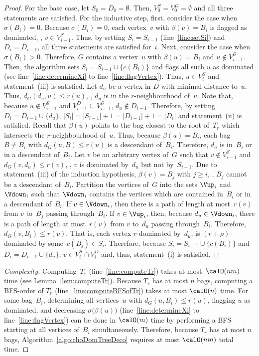 \begin{proof}
For the base case, let $S_0 = D_0 = \emptyset$.
Then, $V^S_0 = V^D_0 = \emptyset$ and all three statements are satisfied.
For the inductive step, first, consider the case when $\sigma(B_i) = 0$.
Because $\sigma(B_i) = 0$, each vertex~$v$ with $\beta(v) = B_i$ is flagged as dominated, \ie, $v \in V^S_{i-1}$.
Thus, by setting $S_i = S_{i - 1}$ (line~\ref{line:setSi}) and $D_i = D_{i - 1}$, all three statements are satisfied for~$i$.
Next, consider the case when $\sigma(B_i) > 0$.
Therefore, $G$ contains a vertex~$u$ with $\beta(u) = B_i$ and $u \notin V^S_{i-1}$.
Then, the algorithm sets $S_i = S_{i-1} \cup \big \{ c(B_i) \big \}$ and flags all such $u$ as dominated (see line~\ref{line:determineXi} to line~\ref{line:flagVertex}).
Thus, $u \in V^S_i$ and statement~(iii) is satisfied.
%
Let $d_u$ be a vertex in $D$ with minimal distance to~$u$.
Thus, $d_G(d_u, u) \leq r(u)$, \ie, $d_u$ is in the $r$-neighbourhood of~$u$.
Note that, because $u \notin V^S_{i-1}$ and $V^D_{i-1} \subseteq V^S_{i-1}$, $d_u \notin D_{i-1}$.
Therefore, by setting $D_i = D_{i-1} \cup \{ d_u \}$, $|S_i| = |S_{i-1}| + 1 = |D_{i-1}| + 1 = |D_i|$ and statement~(ii) is satisfied.
%
Recall that $\beta(u)$ points to the bag closest to the root of~$T_r$ which intersects the $r$-neighbourhood of~$u$.
Thus, because $\beta(u) = B_i$, each bag~$B \neq B_i$ with $d_G(u, B) \leq r(u)$ is a descendant of~$B_i$.
Therefore, $d_u$ is in~$B_i$ or in a descendant of~$B_i$.
Let $v$ be an arbitrary vertex of~$G$ such that $v \notin V^S_{i-1}$ and $d_G(v, d_u) \leq r(v)$, \ie, $v$ is dominated by~$d_u$ but not by~$S_{i-1}$.
Due to statement~(iii) of the induction hypothesis, $\beta(v) = B_j$ with $j \geq i$, \ie, $B_j$ cannot be a descendant of~$B_i$.
Partition the vertices of~$G$ into the sets $\Vup_i$ and~$\Vdown_i$ such that $\Vdown_i$ contains the vertices which are contained in~$B_i$ or in a descendant of~$B_i$.
If $v \in \Vdown_i$, then there is a path of length at most~$r(v)$ from $v$ to~$B_j$ passing through~$B_i$.
If $v \in \Vup_i$, then, because $d_u \in \Vdown_i$, there is a path of length at most~$r(v)$ from $v$ to~$d_u$ passing through~$B_i$.
Therefore, $d_G(v, B_i) \leq r(v)$.
That is, each vertex $r$-dominated by~$d_u$, is $(r + \rho)$-dominated by some~$c(B_j) \in S_i$.
Therefore, because $S_i = S_{i-1} \cup \big \{ c(B_i) \big \}$ and $D_i = D_{i-1} \cup \{ d_u \}$, $v \in V^S_i \cap V^D_i $ and, thus, statement~(i) is satisfied.
\end{proof}

\begin{proof}
    [Complexity]
Computing~$T_r$ (line~\ref{line:computeTr}) takes at most~$\calO(nm)$ time (see Lemma~\ref{lem:computeTr}).
Because $T_r$ has at most $n$ bags, computing a BFS-order of $T_r$ (line~\ref{line:computeBFSofTr}) takes at most $\calO(n)$ time.
For some bag~$B_i$, determining all vertices~$u$ with $d_G(u, B_i) \leq r(u)$, flagging $u$ as dominated, and decreasing $\sigma \big( \beta(u) \big)$ (line~\ref{line:determineXi} to line~\ref{line:flagVertex}) can be done in $\calO(m)$ time by performing a BFS starting at all vertices of~$B_i$ simultaneously.
Therefore, because $T_r$ has at most $n$ bags, Algorithm~\ref{algo:rhoDomTreeDeco} requires at most $\calO(nm)$ total time.
\end{proof}


